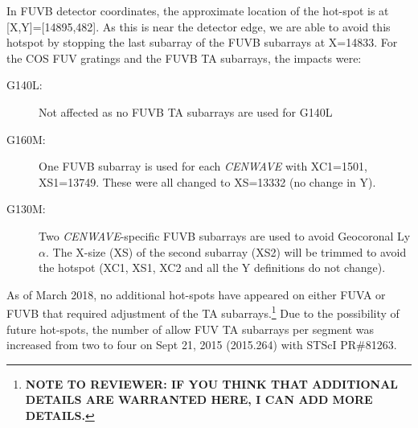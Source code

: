In FUVB detector coordinates, the approximate location of the hot-spot is at [X,Y]=[14895,482]. As this is near the detector edge, we are able to avoid this hotspot by stopping the last subarray of the FUVB subarrays at X=14833.
For the COS FUV gratings and the FUVB TA subarrays, the impacts were:\\
\begin{description}
	\item[G140L:] Not affected as no FUVB TA subarrays are used for G140L
	\item[G160M:] One FUVB subarray is used for each \textit{CENWAVE} with XC1=1501, XS1=13749. These were all changed to XS=13332 (no change in Y).
	\item[G130M:] Two \textit{CENWAVE}-specific FUVB subarrays are used to avoid Geocoronal Ly$\alpha$. The X-size (XS) of the second subarray (XS2) will be trimmed to avoid the hotspot (XC1, XS1, XC2 and all the Y definitions do not change).
\end{description}

As of March 2018, no additional hot-spots have appeared on either FUVA or FUVB that required adjustment of the TA subarrays.\footnote{{\bf NOTE TO REVIEWER: IF YOU THINK THAT ADDITIONAL DETAILS ARE WARRANTED HERE, I CAN ADD MORE DETAILS.}}
Due to the possibility of future hot-spots, the number of allow FUV TA subarrays per segment was increased from two to four on  Sept 21, 2015 (2015.264) with STScI PR\#81263.
